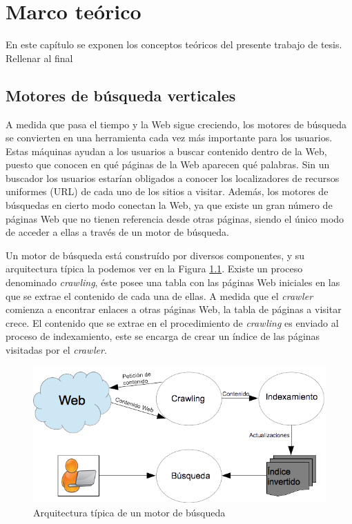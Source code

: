 \chapter{Marco te\'orico}
\label{cap:marco}
En este capítulo se exponen los conceptos teóricos del presente trabajo de tesis. Rellenar al final

\section{Motores de búsqueda verticales}
\label{marco:mbv}
A medida que pasa el tiempo y la Web sigue creciendo, los motores de búsqueda se convierten en una herramienta cada vez más importante para los usuarios. Estas máquinas ayudan a los usuarios a buscar contenido dentro de la Web, puesto que conocen en qué páginas de la Web aparecen qué palabras. Sin un buscador los usuarios estarían obligados a conocer los localizadores de recursos uniformes (URL) de cada uno de los sitios a visitar. Además, los motores de búsquedas en cierto modo conectan la Web, ya que existe un gran número de páginas Web que no tienen referencia desde otras páginas, siendo el único modo de acceder a ellas a través de un motor de búsqueda.

Un motor de búsqueda está construído por diversos componentes, y su arquitectura típica la podemos ver en la Figura \ref{fig:searchenginearchitecture}. Existe un proceso denominado \textit{crawling}, éste posee una tabla con las páginas Web iniciales en las que se extrae el contenido de cada una de ellas. A medida que el \textit{crawler} comienza a encontrar enlaces a otras páginas Web, la tabla de páginas a visitar crece. El contenido que se extrae en el procedimiento de \textit{crawling} es enviado al proceso de indexamiento, este se encarga de crear un índice de las páginas visitadas por el \textit{crawler}. 

\begin{figure}[tp]
\centering
\includegraphics[scale=.75]{images/searchenginearchitecture.png}
\caption{Arquitectura típica de un motor de búsqueda}
\label{fig:searchenginearchitecture}
\end{figure}

